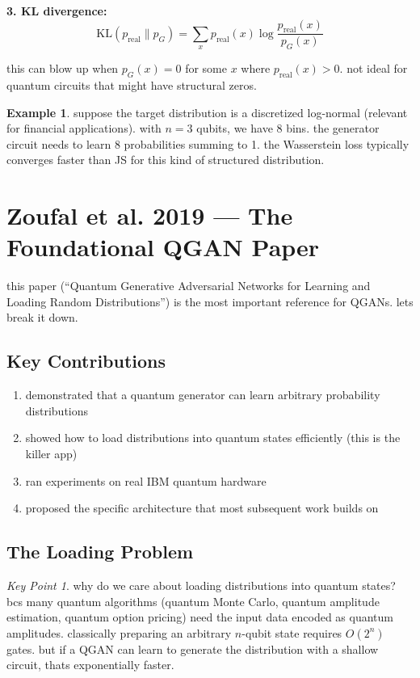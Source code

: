 \documentclass[11pt,a4paper]{article}
\theoremstyle{definition}
\newtheorem{example}{Example}[section]
\theoremstyle{remark}
\newtheorem*{keypoint}{Key Point}
\begin{document}
\textbf{3. KL divergence:}
\[
\text{KL}(p_{\text{real}} \| p_G) = \sum_x p_{\text{real}}(x) \log \frac{p_{\text{real}}(x)}{p_G(x)}
\]

this can blow up when $p_G(x) = 0$ for some $x$ where $p_{\text{real}}(x) > 0$. not ideal for quantum circuits that might have structural zeros.

\begin{example}
suppose the target distribution is a discretized log-normal (relevant for financial applications). with $n = 3$ qubits, we have 8 bins. the generator circuit needs to learn 8 probabilities summing to 1. the Wasserstein loss typically converges faster than JS for this kind of structured distribution.
\end{example}

\section{Zoufal et al. 2019 --- The Foundational QGAN Paper}

this paper (``Quantum Generative Adversarial Networks for Learning and Loading Random Distributions'') is the most important reference for QGANs. lets break it down.

\subsection{Key Contributions}

\begin{enumerate}[label=\arabic*.]
    \item demonstrated that a quantum generator can learn arbitrary probability distributions
    \item showed how to load distributions into quantum states efficiently (this is the killer app)
    \item ran experiments on real IBM quantum hardware
    \item proposed the specific architecture that most subsequent work builds on
\end{enumerate}

\subsection{The Loading Problem}

\begin{keypoint}
why do we care about loading distributions into quantum states? bcs many quantum algorithms (quantum Monte Carlo, quantum amplitude estimation, quantum option pricing) need the input data encoded as quantum amplitudes. classically preparing an arbitrary $n$-qubit state requires $O(2^n)$ gates. but if a QGAN can learn to generate the distribution with a shallow circuit, thats exponentially faster.
\end{keypoint}
\end{document}
